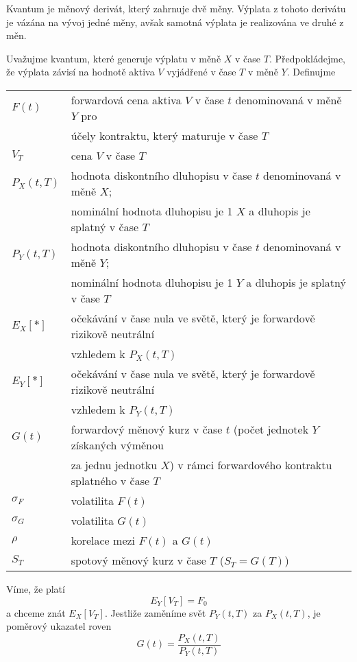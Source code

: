 \documentclass[a4paper]{book}
\begin{document}
Kvantum je měnový derivát, který zahrnuje dvě měny. Výplata z tohoto derivátu je vázána na vývoj jedné měny, avšak samotná výplata je realizována ve druhé z měn.

Uvažujme kvantum, které generuje výplatu v měně $X$ v čase $T$. Předpokládejme, že výplata závisí na hodnotě aktiva $V$ vyjádřené v čase $T$ v měně $Y$. Definujme
\begin{center}
\begin{tabular}{l l}
$F(t)$ & forwardová cena aktiva $V$ v čase $t$ denominovaná v měně $Y$ pro\\
 & účely kontraktu, který maturuje v čase $T$\\
$V_T$ & cena $V$ v čase $T$\\
$P_X(t,T)$ & hodnota diskontního dluhopisu v čase $t$ denominovaná v měně $X$;\\
 & nominální hodnota dluhopisu je 1 $X$ a dluhopis je splatný v čase $T$\\
$P_Y(t,T)$ & hodnota diskontního dluhopisu v čase $t$ denominovaná v měně $Y$;\\
 & nominální hodnota dluhopisu je 1 $Y$ a dluhopis je splatný v čase $T$\\
$E_X[\ast]$ & očekávání v čase nula ve světě, který je forwardově rizikově neutrální\\
 & vzhledem k $P_X(t,T)$\\
$E_Y[\ast]$ & očekávání v čase nula ve světě, který je forwardově rizikově neutrální\\
 & vzhledem k $P_Y(t,T)$\\
$G(t)$ & forwardový měnový kurz v čase $t$ (počet jednotek $Y$ získaných výměnou\\
 & za jednu jednotku $X$) v rámci forwardového kontraktu splatného v čase $T$\\
$\sigma_F$ & volatilita $F(t)$\\
$\sigma_G$ & volatilita $G(t)$\\
$\rho$ & korelace mezi $F(t)$ a $G(t)$\\
$S_T$ & spotový měnový kurz v čase $T$ ($S_T = G(T)$)
\end{tabular}
\end{center}
Víme, že platí
\begin{equation*}
E_Y[V_T] = F_0
\end{equation*}
a chceme znát $E_X[V_T]$. Jestliže zaměníme svět $P_Y(t,T)$ za $P_X(t,T)$, je poměrový ukazatel roven
\begin{equation*}
G(t) = \frac{P_X(t,T)}{P_Y(t,T)}
\end{equation*}
\end{document}
